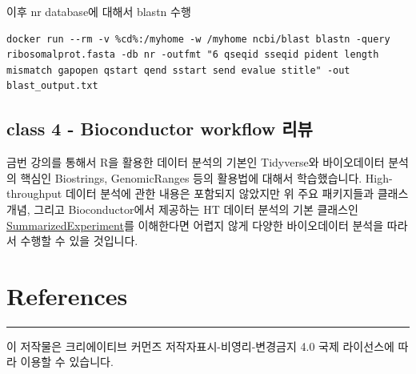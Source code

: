 \documentclass[
]{book}
\begin{document}
이후 nr database에 대해서 blastn 수행

\begin{verbatim}
docker run --rm -v %cd%:/myhome -w /myhome ncbi/blast blastn -query ribosomalprot.fasta -db nr -outfmt "6 qseqid sseqid pident length mismatch gapopen qstart qend sstart send evalue stitle" -out blast_output.txt
\end{verbatim}

\hypertarget{class-4---bioconductor-workflow-uxb9acuxbdf0}{%
\section{class 4 - Bioconductor workflow 리뷰}\label{class-4---bioconductor-workflow-uxb9acuxbdf0}}

금번 강의를 통해서 R을 활용한 데이터 분석의 기본인 Tidyverse와 바이오데이터 분석의 핵심인 Biostrings, GenomicRanges 등의 활용법에 대해서 학습했습니다. High-throughput 데이터 분석에 관한 내용은 포함되지 않았지만 위 주요 패키지들과 클래스 개념, 그리고 Bioconductor에서 제공하는 HT 데이터 분석의 기본 클래스인 \href{https://bioconductor.org/packages/release/bioc/vignettes/SummarizedExperiment/inst/doc/SummarizedExperiment.html}{SummarizedExperiment}를 이해한다면 어렵지 않게 다양한 바이오데이터 분석을 따라서 수행할 수 있을 것입니다.

\hypertarget{references}{%
\chapter{References}\label{references}}

\begin{center}\rule{0.5\linewidth}{0.5pt}\end{center}

이 저작물은 크리에이티브 커먼즈 저작자표시-비영리-변경금지 4.0 국제 라이선스에 따라 이용할 수 있습니다.
\end{document}

